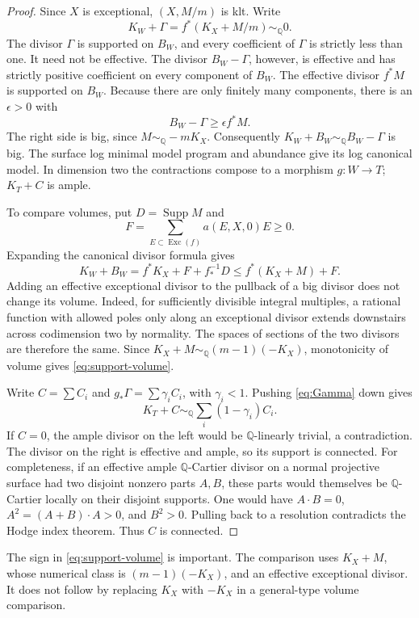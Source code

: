 \documentclass[12pt,a4paper]{article}
\numberwithin{equation}{section}
\theoremstyle{definition}
\newcommand{\Q}{\mathbb Q}
\newcommand{\Supp}{\operatorname{Supp}}
\newcommand{\Exc}{\operatorname{Exc}}
\begin{document}
\begin{proof}
Since \(X\) is exceptional, \((X,M/m)\) is klt. Write
\begin{equation}\label{eq:Gamma}
                       K_W+\Gamma=f^*(K_X+M/m)\sim_{\Q}0.
\end{equation}
The divisor \(\Gamma\) is supported on \(B_W\), and every coefficient
of \(\Gamma\) is strictly less than one. It need not be effective.
The divisor \(B_W-\Gamma\), however, is effective and has strictly
positive coefficient on every component of \(B_W\).
The effective divisor \(f^*M\) is supported on \(B_W\).
Because there are only finitely many components, there is an
\(\epsilon>0\) with
\[
                       B_W-\Gamma\geq\epsilon f^*M.
\]
The right side is big, since \(M\sim_{\Q}-mK_X\).
Consequently \(K_W+B_W\sim_{\Q}B_W-\Gamma\) is big.
The surface log minimal model program and abundance give its
log canonical model. In dimension two the contractions compose
to a morphism \(g:W\to T\); \(K_T+C\) is ample.

To compare volumes, put \(D=\Supp M\) and
\[
                      F=\sum_{E\subset\Exc(f)}a(E,X,0)E\geq0.
\]
Expanding the canonical divisor formula gives
\[
 K_W+B_W=f^*K_X+F+f_*^{-1}D
              \leq f^*(K_X+M)+F.
\]
Adding an effective exceptional divisor to the pullback of a big
divisor does not change its volume. Indeed, for sufficiently
divisible integral multiples, a rational function with allowed
poles only along an exceptional divisor extends downstairs across
codimension two by normality. The spaces of sections of the two
divisors are therefore the same.
Since \(K_X+M\sim_{\Q}(m-1)(-K_X)\), monotonicity of volume gives
\eqref{eq:support-volume}.

Write \(C=\sum C_i\) and
\(g_*\Gamma=\sum\gamma_iC_i\), with \(\gamma_i<1\).
Pushing \eqref{eq:Gamma} down gives
\[
                    K_T+C\sim_{\Q}\sum_i(1-\gamma_i)C_i.
\]
If \(C=0\), the ample divisor on the left would be
\(\Q\)-linearly trivial, a contradiction.
The divisor on the right is effective and ample, so its support is
connected.
For completeness, if an effective ample \(\Q\)-Cartier divisor on
a normal projective surface had two disjoint nonzero parts \(A,B\),
these parts would themselves be \(\Q\)-Cartier locally on their
disjoint supports. One would have
\(A\cdot B=0\), \(A^2=(A+B)\cdot A>0\), and \(B^2>0\).
Pulling back to a resolution contradicts the Hodge index theorem.
Thus \(C\) is connected.
\end{proof}

The sign in \eqref{eq:support-volume} is important.
The comparison uses \(K_X+M\), whose numerical class is
\((m-1)(-K_X)\), and an effective exceptional divisor.
It does not follow by replacing \(K_X\) with \(-K_X\) in a
general-type volume comparison.
\end{document}
